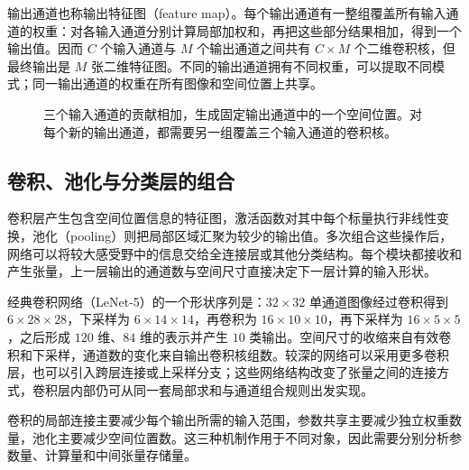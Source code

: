 输出通道也称输出特征图（feature map）。每个输出通道有一整组覆盖所有输入通道的权重：对各输入通道分别计算局部加权和，再把这些部分结果相加，得到一个输出值。因而 $C$ 个输入通道与 $M$ 个输出通道之间共有 $C\times M$ 个二维卷积核，但最终输出是 $M$ 张二维特征图。不同的输出通道拥有不同权重，可以提取不同模式；同一输出通道的权重在所有图像和空间位置上共享。

\begin{figure}[htbp]
\centering
{}
\caption{三个输入通道的贡献相加，生成固定输出通道中的一个空间位置。对每个新的输出通道，都需要另一组覆盖三个输入通道的卷积核。}
\label{l11:fig:channels}
\end{figure}

\subsection{卷积、池化与分类层的组合}

卷积层产生包含空间位置信息的特征图，激活函数对其中每个标量执行非线性变换，池化（pooling）则把局部区域汇聚为较少的输出值。多次组合这些操作后，网络可以将较大感受野中的信息交给全连接层或其他分类结构。每个模块都接收和产生张量，上一层输出的通道数与空间尺寸直接决定下一层计算的输入形状。

经典卷积网络（LeNet-5）的一个形状序列是：$32\times32$ 单通道图像经过卷积得到 $6\times28\times28$，下采样为 $6\times14\times14$，再卷积为 $16\times10\times10$，再下采样为 $16\times5\times5$，之后形成 $120$ 维、$84$ 维的表示并产生 $10$ 类输出。空间尺寸的收缩来自有效卷积和下采样，通道数的变化来自输出卷积核组数。较深的网络可以采用更多卷积层，也可以引入跨层连接或上采样分支；这些网络结构改变了张量之间的连接方式，卷积层内部仍可从同一套局部求和与通道组合规则出发实现。

卷积的局部连接主要减少每个输出所需的输入范围，参数共享主要减少独立权重数量，池化主要减少空间位置数。这三种机制作用于不同对象，因此需要分别分析参数量、计算量和中间张量存储量。
